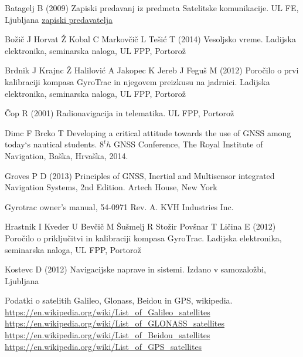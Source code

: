 %
%
%
% 
% 
%
\begin{thebibliography}{99.}
%
%
%
 Batagelj B (2009) Zapiski predavanj iz predmeta Satelitske komunikacije. UL FE, Ljubljana \href{http://lso.fe.uni-lj.si/studij/sateliti/gradivo/01p_sk.pdf}{zapiski predavatelja}

 Božič J Horvat Ž Kobal C Markovčič L Tešić T (2014)  Vesoljsko vreme. Ladijska elektronika, seminarska naloga, UL FPP, Portorož %

 Brdnik J Krajnc Ž Halilović A Jakopec K Jereb J Feguš M (2012)  Poročilo o prvi kalibraciji kompasa GyroTrac in njegovem preizkusu na jadrnici. Ladijska elektronika, seminarska naloga, UL FPP, Portorož %

 Čop R (2001) Radionavigacija in telematika. UL FPP, Portorož %

 Dimc F Brcko T Developing a critical attitude towards the use of GNSS among today`s nautical students. $8^th$ GNSS Conference, The Royal Institute of Navigation, Baška, Hrvaška, 2014. %

 Groves P D (2013) Principles of GNSS, Inertial and Multisensor integrated Navigation Systems, 2nd Edition. Artech House, New York %

 Gyrotrac owner's manual, 54-0971 Rev. A. KVH Industries Inc.   %

 Hrastnik I Kveder U Bevčič M Šušmelj R Stožir Povšnar T Ličina E (2012)  Poročilo o priključitvi in kalibraciji kompasa GyroTrac. Ladijska elektronika, seminarska naloga, UL FPP, Portorož %

 Kostevc D (2012) Navigacijske naprave in sistemi. Izdano v samozaložbi, Ljubljana

 Podatki o satelitih Galileo, Glonass, Beidou in GPS, wikipedia. \\
 \url{https://en.wikipedia.org/wiki/List_of_Galileo_satellites} \\
 \url{https://en.wikipedia.org/wiki/List_of_GLONASS_satellites} \\
 \url{https://en.wikipedia.org/wiki/List_of_Beidou_satellites} \\  \url{https://en.wikipedia.org/wiki/List_of_GPS_satellites} 




\end{thebibliography}
